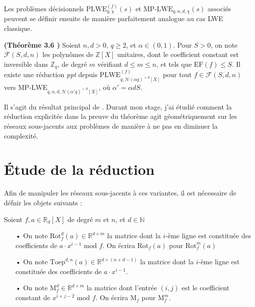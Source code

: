 \documentclass[11pt,a4paper]{article}
\begin{document}
Les problèmes décisionnels $\text{PLWE}^{(f)}_{q,\chi}(s)$ et $\text{MP-LWE}_{q,n,d,\chi}(s)$ associés peuvent se définir ensuite de manière parfaitement analogue au cas LWE classique. \\

\begin{theorem}\textbf{(Théorème 3.6 \cite{mplwe})}
Soient $n,d >0$, $q\geq 2$, et $\alpha \in (0,1)$. Pour $S>0$, on note $\mathcal{F}(S,d,n)$ les polynômes de $\mathbb{Z}[X]$ unitaires, dont le coefficient constant est inversible dans $\mathbb{Z}_q$, de degré $m$ vérifiant $d\leq m\leq n$, et tels que $\text{EF}(f)\leq S$. Il existe une réduction \textit{ppt} depuis $\text{PLWE}^{(f)}_{q,\mathcal{N}(\alpha q)^{<d}[X]}$ pour tout $f\in\mathcal{F}(S,d,n)$ vers  $\text{MP-LWE}_{q,n,d,\mathcal{N}(\alpha' q)^{<d}[X]}$, où $\alpha' = \alpha d S$.
\end{theorem}

Il s'agit du résultat principal de \cite{mplwe}. Durant mon stage, j'ai étudié comment la réduction explicitée dans la preuve du théorème agit géométriquement sur les réseaux sous-jacents aux problèmes de manière à ne pas en diminuer 	la complexité.

\section{Étude de la réduction}

Afin de manipuler les réseaux sous-jacents à ces variantes, il est nécessaire de défnir les objets suivants : 

\begin{defin} Soient $f,a\in \mathbb{R}_d[X]$ de degré $m$ et $n$, et $d \in \mathbb{N}$
\begin{enumerate}
\item[•] On note $\text{Rot}^d_f(a) \in \mathbb{R}^{d\times m}$ la matrice dont la $i$-ème ligne est constituée des coefficients de $a\cdot x^{i-1}\text{ mod } f$. On écrira $\text{Rot}_f(a)$ pour  $\text{Rot}^m_f(a)$
\item[•] On note $\text{Toep}^{d,n}(a) \in \mathbb{R}^{d\times(n+d-1)}$ la matrice dont la $i$-ème ligne est constituée des coefficients de $a\cdot x^{i-1}$.
\item[•] On note $\text{M}_f^d \in \mathbb{R}^{d\times m}$ la matrice dont l'entrée $(i,j)$ est le coefficient constant de $x^{i+j-2}\text{ mod }f$. On écrira $\text{M}_f$ pour  $\text{M}_f^m$.
\end{enumerate}
\end{defin}
\end{document}
